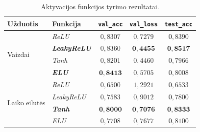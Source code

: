 \begin{table}[H]
    \centering
    \caption{Aktyvacijos funkcijos tyrimo rezultatai.}
    \begin{tabular}{|l|l|c|c|c|}
        \hline
        Užduotis & Funkcija & \texttt{val\_acc} & \texttt{val\_loss} & \texttt{test\_acc} \\
        \hline
        \multirow{4}{*}{Vaizdai}
            & \textit{ReLU}        & $0{,}8307$ & $0{,}7279$ & $0{,}8390$ \\ \cline{2-5}
            & \textbf{\textit{LeakyReLU}}  & $0{,}8360$ & $\mathbf{0{,}4455}$ & $\mathbf{0{,}8517}$ \\ \cline{2-5}
            & \textit{Tanh}        & $0{,}8201$ & $0{,}4460$ & $0{,}7966$ \\ \cline{2-5}
            & \textbf{\textit{ELU}} & $\mathbf{0{,}8413}$ & $0{,}5705$ & $0{,}8008$ \\
        \hline
        \multirow{4}{*}{Laiko eilutės}
            & \textit{ReLU}        & $0{,}6500$ & $1{,}2921$ & $0{,}6533$ \\ \cline{2-5}
            & \textit{LeakyReLU}   & $0{,}7583$ & $0{,}9012$ & $0{,}7800$ \\ \cline{2-5}
            & \textbf{\textit{Tanh}} & $\mathbf{0{,}8000}$ & $\mathbf{0{,}7076}$ & $\mathbf{0{,}8333}$ \\ \cline{2-5}
            & \textit{ELU}         & $0{,}7708$ & $0{,}7677$ & $0{,}8100$ \\
        \hline
    \end{tabular}
    \label{tab:rez_aktyvacija}
\end{table}
